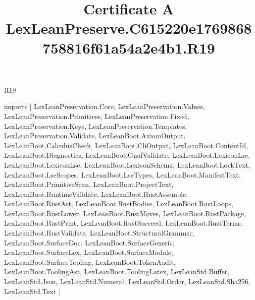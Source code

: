 \begin{lexlean}{R19}
\title{Certificate A LexLeanPreserve.C615220e1769868758816f61a54a2e4b1.R19}
\begin{coremodule}
imports [
  LexLeanPreservation.Core,
  LexLeanPreservation.Values,
  LexLeanPreservation.Primitives,
  LexLeanPreservation.Fixed,
  LexLeanPreservation.Keys,
  LexLeanPreservation.Templates,
  LexLeanPreservation.Validate,
  LexLeanBoot.AxiomOutput,
  LexLeanBoot.CalculusCheck,
  LexLeanBoot.CliOutput,
  LexLeanBoot.ContentId,
  LexLeanBoot.Diagnostics,
  LexLeanBoot.GnafValidate,
  LexLeanBoot.LexiconLre,
  LexLeanBoot.LexiconLse,
  LexLeanBoot.LexiconSchema,
  LexLeanBoot.LockText,
  LexLeanBoot.LseScopes,
  LexLeanBoot.LseTypes,
  LexLeanBoot.ManifestText,
  LexLeanBoot.PrimitiveScan,
  LexLeanBoot.ProjectText,
  LexLeanBoot.RuntimeValidate,
  LexLeanBoot.RustAssemble,
  LexLeanBoot.RustAst,
  LexLeanBoot.RustBodies,
  LexLeanBoot.RustLoops,
  LexLeanBoot.RustLower,
  LexLeanBoot.RustMoves,
  LexLeanBoot.RustPackage,
  LexLeanBoot.RustPrint,
  LexLeanBoot.RustSucceed,
  LexLeanBoot.RustTerms,
  LexLeanBoot.RustValidate,
  LexLeanBoot.StructuralGrammar,
  LexLeanBoot.SurfaceDoc,
  LexLeanBoot.SurfaceGeneric,
  LexLeanBoot.SurfaceLex,
  LexLeanBoot.SurfaceModule,
  LexLeanBoot.SurfaceTooling,
  LexLeanBoot.TokenAudit,
  LexLeanBoot.ToolingAst,
  LexLeanBoot.ToolingLatex,
  LexLeanStd.Buffer,
  LexLeanStd.Json,
  LexLeanStd.Numeral,
  LexLeanStd.Order,
  LexLeanStd.Sha256,
  LexLeanStd.Text
]


\end{coremodule}
\end{lexlean}
